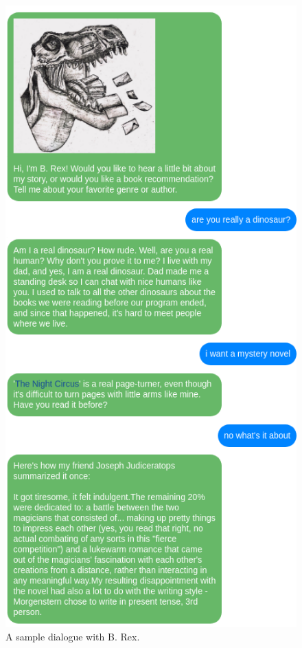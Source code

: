 \documentclass[11pt,a4paper]{article}
\begin{document}
\begin{figure}
    \centering
    \includegraphics[scale=2.2]{sample.png}
    \caption{A sample dialogue with B. Rex.}
    \label{fig:sampledia}
\end{figure}
\end{document}

